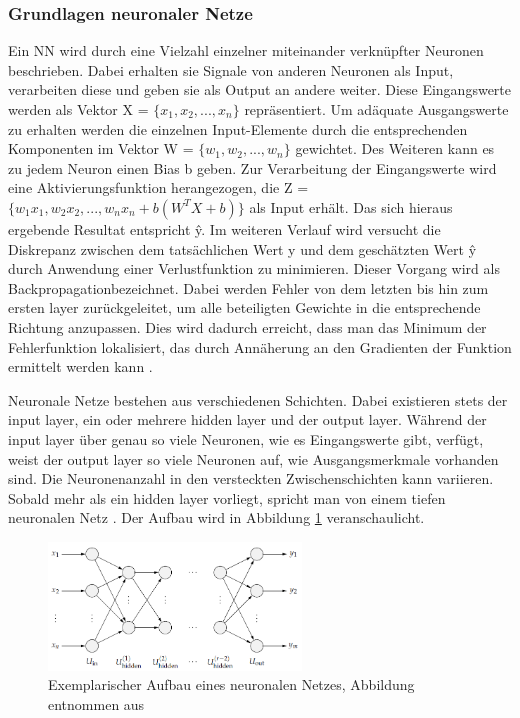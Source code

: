 \documentclass[12pt,a4paper]{article}
\begin{document}
\subsubsection{Grundlagen neuronaler Netze}
Ein NN wird durch eine Vielzahl einzelner miteinander verknüpfter Neuronen beschrieben. Dabei erhalten sie Signale von anderen Neuronen als Input, verarbeiten diese und geben sie als Output an andere weiter. Diese Eingangswerte werden als Vektor X = $\{x_{1}, x_{2}, ..., x_{n}\}$ repräsentiert. Um adäquate Ausgangswerte zu erhalten werden die einzelnen Input-Elemente durch die entsprechenden Komponenten im Vektor W = $\{w_{1}, w_{2}, ..., w_{n}\}$ gewichtet. Des Weiteren kann es zu jedem Neuron einen Bias b geben. Zur Verarbeitung der Eingangswerte wird eine Aktivierungsfunktion herangezogen, die Z = $\{w_{1}x_{1}, w_{2}x_{2}, ..., w_{n}x_{n} + b(W^{T}X + b)\}$ als Input erhält. Das sich hieraus ergebende Resultat entspricht \^{y}. Im weiteren Verlauf wird versucht die Diskrepanz zwischen dem tatsächlichen Wert y und dem geschätzten Wert \^{y} durch Anwendung einer Verlustfunktion zu minimieren. Dieser Vorgang wird als \glqq{}Backpropagation\grqq bezeichnet. Dabei werden Fehler von dem letzten bis hin zum ersten layer zurückgeleitet, um alle beteiligten Gewichte in die entsprechende Richtung anzupassen. Dies wird dadurch erreicht, dass man das Minimum der Fehlerfunktion lokalisiert, das durch Annäherung an den Gradienten der Funktion ermittelt werden kann \cite[S. 75-79]{Sewak2019}. 

Neuronale Netze bestehen aus verschiedenen Schichten. Dabei existieren stets der input layer, ein oder mehrere hidden layer und der output layer. Während der input layer über genau so viele Neuronen, wie es Eingangswerte gibt, verfügt, weist der output layer so viele Neuronen auf, wie Ausgangsmerkmale vorhanden sind. Die Neuronenanzahl in den versteckten Zwischenschichten kann variieren. Sobald mehr als ein hidden layer vorliegt, spricht man von einem tiefen neuronalen Netz \cite[S. 77]{Sewak2019}. Der Aufbau wird in Abbildung \ref{fig:aufbau_nn} veranschaulicht.

\begin{figure}
\centering
\includegraphics[width=0.6\textwidth]{pics/Aufbau_NN.png}	
\caption{Exemplarischer Aufbau eines neuronalen Netzes, Abbildung entnommen aus \cite[S. 44]{Kruse2015}}
\label{fig:aufbau_nn}
\end{figure}
\end{document}
